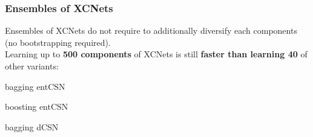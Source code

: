 \documentclass[xcolor={usenames,dvipsnames,svgnames}, compress]{beamer}
\begin{document}
\begin{frame}[t]
  \frametitle{Ensembles of XCNets}
  \small

  
  Ensembles of XCNets do not require to additionally
  diversify each components (no bootstrapping required).\\[10pt]

  Learning up to \textbf{500 components} of XCNets is still \textbf{faster
than learning 40} of other variants:

\vspace{10pt}

    \begin{center}
      \begin{minipage}{0.9\linewidth}
        \begin{description}[align=parright]
        \item[\textbf{\textsf{CNet}}$_{\mathsf{bag}}$]
          bagging \textsf{entCSN}~\parencite{Rahman2016a}\par
        \item[\textbf{\textsf{CNet}}$_{\mathsf{boost}}$]
          boosting \textsf{entCSN}~\parencite{Rahman2016a}\par
        \item[\textbf{\textsf{dCSN}}$^{k}$]
          bagging \textsf{dCSN}~\parencite{DiMauro2015a,DiMauro2015b}\par
        \end{description}
      \end{minipage}
    \end{center}
  \end{frame}
\end{document}
